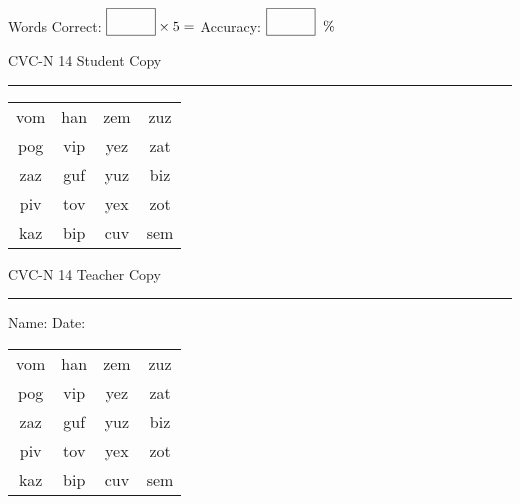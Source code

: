 \documentclass{memoir}
\begin{document}
\small

Words Correct: $\fbox{\phantom{\huge 100}} \times 5 = $ Accuracy: $\fbox{\phantom{\huge 100}}\;\; \%$ 

\vfill

\newpage


\footnotesize \noindent
CVC-N 14 \hfill Student Copy
\smallskip
\hrule

\Large

\setlength{\tabcolsep}{14pt}
\def\arraystretch{2}

{\selectfont


\begin{vplace}[0.5]
\begin{center}
\begin{tabular}{cccc}
vom & han & zem & zuz \\
pog & vip & yez & zat \\
zaz & guf & yuz & biz \\
piv & tov & yex & zot \\
kaz & bip & cuv & sem \\
\end{tabular}
\end{center}
\end{vplace}

}

\newpage

\footnotesize \noindent
CVC-N 14 \hfill Teacher Copy
\smallskip
\hrule

\small

\vfill

\noindent
Name: \underline{\hspace{1.75in}} \hfill Date: \underline{\hspace{1in}}

\Large

{\selectfont


\begin{vplace}[0.5]
\begin{center}
\begin{tabular}{cccc}
vom & han & zem & zuz \\
pog & vip & yez & zat \\
zaz & guf & yuz & biz \\
piv & tov & yex & zot \\
kaz & bip & cuv & sem \\
\end{tabular}
\end{center}
\end{vplace}



}
\end{document}
